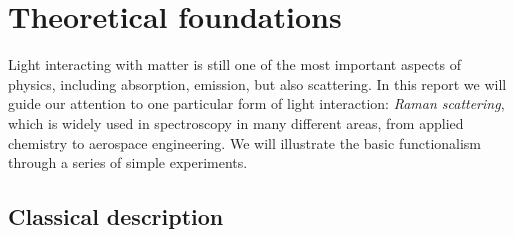 \section{Theoretical foundations}
Light interacting with matter is still one of the most important aspects of physics, including
absorption, emission, but also scattering. In this report we will guide our attention to one
particular form of light interaction: \textit{Raman scattering}, which is widely used in spectroscopy
in many different areas, from applied chemistry to aerospace engineering. We will illustrate the 
basic functionalism through a series of simple experiments.

\subsection{Classical description}
\label{sub:classical_description}

